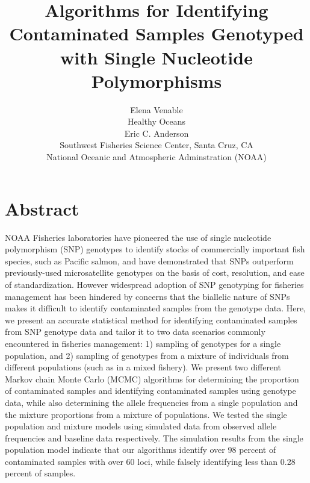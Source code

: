 \documentclass[12pt]{article}
\begin{document}
\normalem

\setlength{\parindent}{0cm}
\title{\textbf{Algorithms for Identifying Contaminated Samples Genotyped with Single Nucleotide Polymorphisms}}
\author{\Large Elena Venable\\ 
	Healthy Oceans\\
	Eric C. Anderson\\
	Southwest Fisheries Science Center, Santa Cruz, CA\\
	National Oceanic and Atmospheric Adminstration (NOAA)}
\maketitle

\section*{Abstract} 
NOAA Fisheries laboratories have pioneered the use of single nucleotide polymorphism (SNP) genotypes to identify stocks of commercially important fish species, such as Pacific salmon, and have demonstrated that SNPs outperform previously-used microsatellite genotypes on the basis of cost, resolution, and ease of standardization. However widespread adoption of SNP genotyping for fisheries management has been hindered by concerns that the biallelic nature of SNPs makes it difficult to identify contaminated samples from the genotype data. Here, we present an accurate statistical method for identifying contaminated samples from SNP genotype data and tailor it to two data scenarios commonly encountered in fisheries management: 1) sampling of genotypes for a single population, and 2) sampling of genotypes from a mixture of individuals from different populations (such as in a mixed fishery).   We present two different Markov chain Monte Carlo (MCMC) algorithms for determining the proportion of contaminated samples and identifying contaminated samples using genotype data, while also determining the allele frequencies from a single population and the mixture proportions from a mixture of populations.  We tested the single population and mixture models using simulated data from observed allele frequencies and baseline data respectively.  The simulation results from the single population model indicate that our algorithms identify over 98 percent of contaminated samples with over 60 loci, while falsely identifying less than 0.28 percent of samples. 
\end{document}
